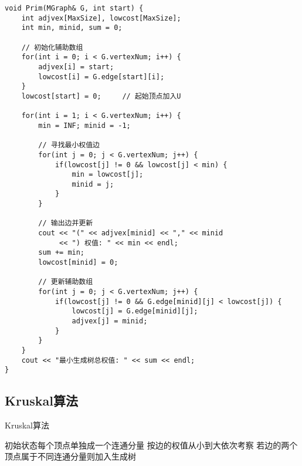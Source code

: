 \documentclass[12pt,a4paper]{amsart}
\begin{document}
\begin{lstlisting}[caption=Prim算法实现]
void Prim(MGraph& G, int start) {
    int adjvex[MaxSize], lowcost[MaxSize];
    int min, minid, sum = 0;
    
    // 初始化辅助数组
    for(int i = 0; i < G.vertexNum; i++) {
        adjvex[i] = start;
        lowcost[i] = G.edge[start][i];
    }
    lowcost[start] = 0;     // 起始顶点加入U
    
    for(int i = 1; i < G.vertexNum; i++) {
        min = INF; minid = -1;
        
        // 寻找最小权值边
        for(int j = 0; j < G.vertexNum; j++) {
            if(lowcost[j] != 0 && lowcost[j] < min) {
                min = lowcost[j];
                minid = j;
            }
        }
        
        // 输出边并更新
        cout << "(" << adjvex[minid] << "," << minid 
             << ") 权值: " << min << endl;
        sum += min;
        lowcost[minid] = 0;
        
        // 更新辅助数组
        for(int j = 0; j < G.vertexNum; j++) {
            if(lowcost[j] != 0 && G.edge[minid][j] < lowcost[j]) {
                lowcost[j] = G.edge[minid][j];
                adjvex[j] = minid;
            }
        }
    }
    cout << "最小生成树总权值: " << sum << endl;
}
\end{lstlisting}

\subsection{Kruskal算法}
\indent

\begin{algorithm}[H]
\caption{Kruskal算法}
\begin{algorithmic}[1]
\STATE 初始状态每个顶点单独成一个连通分量
\STATE 按边的权值从小到大依次考察
\STATE 若边的两个顶点属于不同连通分量则加入生成树
\end{algorithmic}
\end{algorithm}
\end{document}
